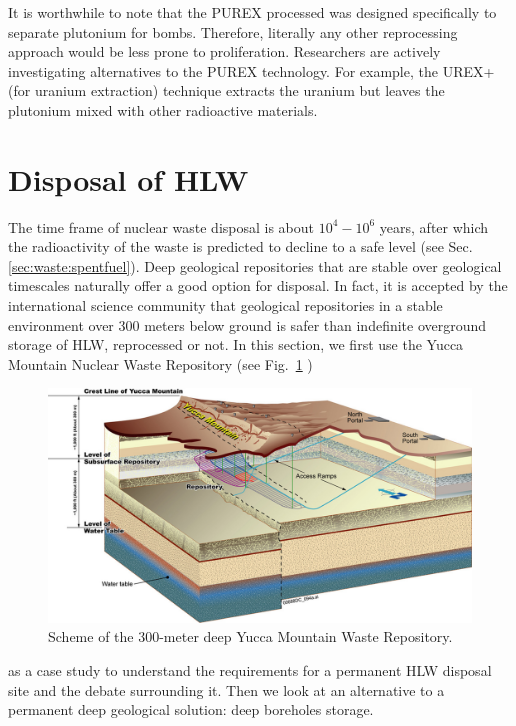 \documentclass[nofootinbib,preprint,aps]{revtex4-1}
\begin{document}
    It is worthwhile to note that the PUREX processed was designed specifically to separate plutonium for
    bombs. Therefore, literally any other reprocessing approach would be less prone to proliferation.
    Researchers are actively investigating alternatives to the PUREX technology. For example, the UREX+ (for
    uranium extraction) technique extracts the uranium but leaves the plutonium mixed with other
    radioactive materials.\cite{aa12}

\section{Disposal of HLW}
\label{sec:disposal}
    The time frame of nuclear waste disposal is about $10^4-10^6$ years, after which the radioactivity
    of the waste is predicted to decline to a safe level (see Sec.\ref{sec:waste:spentfuel}).
    Deep geological repositories that are stable over geological timescales naturally offer a good option for disposal.
    In fact, it is accepted by the international science community that geological repositories in a stable environment over 300 meters below ground
    is safer than indefinite overground storage of HLW, reprocessed or not.\cite{fmr11}
    In this section, we first use the Yucca Mountain Nuclear Waste
    Repository (see Fig.~\ref{fig:yucca} )
        \begin{figure}[h]
            \centering
            \includegraphics[width=\textwidth]{yuccaRepo.jpg}
            \caption{Scheme of the 300-meter deep Yucca Mountain Waste Repository.\cite{yucpic}}
            \label{fig:yucca}
        \end{figure}
    as a case study to understand the requirements for a permanent HLW disposal site and the debate
    surrounding it.
    Then we look at an alternative to a permanent deep geological solution:
    deep boreholes storage.
\end{document}
